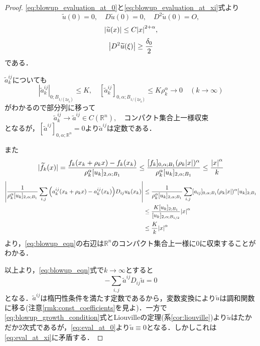 \documentclass[a4paper]{ltjsarticle}
\newcommand{\Rset}{\mathbb{R}}
\newcommand{\1}{\mathbbm{1}}
\numberwithin{equation}{section}
\theoremstyle{definition}
\begin{document}
\begin{proof}
    \eqref{eq:blowup_evaluation_at_0}と\eqref{eq:blowup_evaluation_at_xi}式より
    \begin{equation}
        \widetilde{u}(0)=0,\quad D\widetilde{u}(0)=0,\quad D^2\widetilde{u}(0)=O,\label{eq:eval_at_0}
    \end{equation}
    \begin{equation}
        \abs{\widetilde{u}(x)}\leq C\abs{x}^{2+\alpha},\label{eq:blowup_growth_condition}
    \end{equation}
    \begin{equation}
        \abs{D^2\widetilde{u}(\xi)}\geq \frac{\delta_0}{2}\label{eq:eval_at_xi}
    \end{equation}
    である．

    $\widetilde{a}^{ij}_k$についても
    \begin{equation}
        |\widetilde{a}^{ij}_k|_{0;B_{1/(2\rho_k)}}\leq K,\quad [\widetilde{a}^{ij}_k]_{0,\alpha;B_{1/(2\rho_k)}}\leq K\rho_k^\alpha\to0\quad (k\to\infty)
    \end{equation}
    がわかるので部分列に移って
    \begin{equation}
        \widetilde{a}^{ij}_{k}\to \widetilde{a}^{ij}\in C(\Rset^n),\quad \text{コンパクト集合上一様収束}
    \end{equation}
    となるが，$[\widetilde{a}^{ij}]_{0,\alpha;\Rset^n}=0$より$\widetilde{a}^{ij}$は定数である．

    また
    \begin{equation}
        |\widetilde{f}_k(x)|=\frac{f_k(x_k+\rho_kx)-f_k(x_k)}{\rho_k^\alpha[u_k]_{2,\alpha;B_1}}\leq \frac{[f_k]_{0,\alpha;B_1}(\rho_k\abs{x})^{\alpha}}{\rho_k^\alpha[u_k]_{2,\alpha;B_1}}\leq \frac{\abs{x}^\alpha}{k}
    \end{equation}
    \begin{align}
        \abs{\frac{1}{\rho_k^\alpha [u_k]_{2,\alpha;B_1}}\sum_{i,j}\qty(a^{ij}_k(x_k+\rho_kx)-a^{ij}_k(x_k))D_{ij}u_k(x_k)}
        &\leq \frac{1}{\rho_k^\alpha[u_k]_{2,\alpha;B_1}}\sum_{i,j}[a_{ij}]_{0,\alpha;B_1}(\rho_k\abs{x})^\alpha [u_k]_{2;B_1}\\
        &\leq \frac{K[u_{k}]_{2;B_1}}{[u_k]_{2,\alpha;B_{1/2}}}\abs{x}^{\alpha}\\
        &\leq \frac{K}{k}\abs{x}^\alpha
    \end{align}
    より，\eqref{eq:blowup_eqn}の右辺は$\Rset^n$のコンパクト集合上一様に0に収束することがわかる．

    以上より，\eqref{eq:blowup_eqn}式で$k\to\infty$とすると
    \begin{equation}
        -\sum_{i,j}\widetilde{a}^{ij}D_{ij}\widetilde{u}=0 
    \end{equation}
    となる．$\widetilde{a}^{ij}$は楕円性条件を満たす定数であるから，変数変換により$\widetilde{u}$は調和関数に移る(注意\ref{rmk:const_coefficients}を見よ)．一方で\eqref{eq:blowup_growth_condition}式とLiouvilleの定理(系\ref{cor:liouville})より$\widetilde{u}$はたかだか2次式であるが，\eqref{eq:eval_at_0}より$\widetilde{u}\equiv0$となる．しかしこれは\eqref{eq:eval_at_xi}に矛盾する．
\end{proof}
\end{document}
